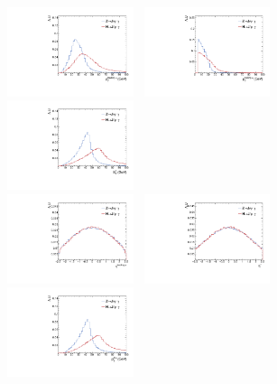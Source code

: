 \begin{figure}[p]\begin{center}  
\includegraphics[width=0.33\textwidth]{Fig/GenLevel_HJpsiG/plot_ZHJpsiG/ZHJpsiG_mu1Pt}~
\includegraphics[width=0.33\textwidth]{Fig/GenLevel_HJpsiG/plot_ZHJpsiG/ZHJpsiG_mu2Pt}~
\includegraphics[width=0.33\textwidth]{Fig/GenLevel_HJpsiG/plot_ZHJpsiG/ZHJpsiG_phoEt}\\
\includegraphics[width=0.33\textwidth]{Fig/GenLevel_HJpsiG/plot_ZHJpsiG/ZHJpsiG_mu1Eta}~
\includegraphics[width=0.33\textwidth]{Fig/GenLevel_HJpsiG/plot_ZHJpsiG/ZHJpsiG_phoEta}~
\includegraphics[width=0.33\textwidth]{Fig/GenLevel_HJpsiG/plot_ZHJpsiG/ZHJpsiG_dimuPt}\\

\end{center}
\end{figure}
